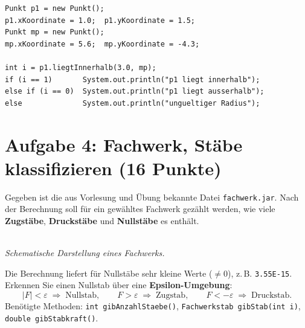 \documentclass[
	fontsize=12pt,
	paper=a4,
	numbers=noenddot,
	parskip=half,
	openany
]{scrbook}
\begin{document}
\begin{lstlisting}
Punkt p1 = new Punkt();
p1.xKoordinate = 1.0;  p1.yKoordinate = 1.5;
Punkt mp = new Punkt();
mp.xKoordinate = 5.6;  mp.yKoordinate = -4.3;

int i = p1.liegtInnerhalb(3.0, mp);
if (i == 1)       System.out.println("p1 liegt innerhalb");
else if (i == 0)  System.out.println("p1 liegt ausserhalb");
else              System.out.println("ungueltiger Radius");
\end{lstlisting}

\clearpage
\section*{Aufgabe 4: Fachwerk, Stäbe klassifizieren \hfill (16 Punkte)}

Gegeben ist die aus Vorlesung und Übung bekannte Datei \texttt{fachwerk.jar}. Nach der Berechnung soll für ein gewähltes Fachwerk gezählt werden, wie viele \textbf{Zugstäbe}, \textbf{Druckstäbe} und \textbf{Nullstäbe} es enthält.

\begin{center}
\\[-0.3em]
{\footnotesize\itshape Schematische Darstellung eines Fachwerks.}
\end{center}

\begin{hinweis}
	Die Berechnung liefert für Nullstäbe sehr kleine Werte ($\ne 0$), z.\,B. \texttt{3.55E-15}. Erkennen Sie einen Nullstab über eine \textbf{Epsilon-Umgebung}:
	\[ |F| < \varepsilon \;\Rightarrow\; \text{Nullstab}, \qquad
	   F > \varepsilon \;\Rightarrow\; \text{Zugstab}, \qquad
	   F < -\varepsilon \;\Rightarrow\; \text{Druckstab.} \]
	Benötigte Methoden: \texttt{int gibAnzahlStaebe()}, \texttt{Fachwerkstab gibStab(int i)}, \texttt{double gibStabkraft()}.
\end{hinweis}
\end{document}
